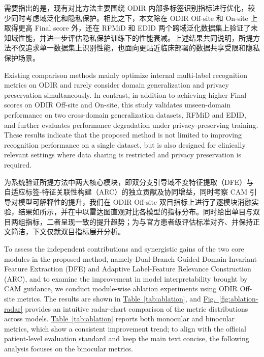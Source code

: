 需要指出的是，现有对比方法主要围绕 ODIR 内部多标签识别指标进行优化，较少同时考虑域泛化和隐私保护。相比之下，本文除在 ODIR Off-site 和 On-site 上取得更高 Final score 外，还在 RFMiD 和 EDID 两个跨域泛化数据集上验证了未知域性能，并进一步评估隐私保护训练下的性能衰减。上述结果共同说明，所提方法不仅追求单一数据集上识别性能，也面向更贴近临床部署的数据共享受限和隐私保护场景。

Existing comparison methods mainly optimize internal multi-label recognition metrics on ODIR and rarely consider domain generalization and privacy preservation simultaneously. In contrast, in addition to achieving higher Final scores on ODIR Off-site and On-site, this study validates unseen-domain performance on two cross-domain generalization datasets, RFMiD and EDID, and further evaluates performance degradation under privacy-preserving training. These results indicate that the proposed method is not limited to improving recognition performance on a single dataset, but is also designed for clinically relevant settings where data sharing is restricted and privacy preservation is required.



为系统验证所提方法中两大核心模块，即双分支引导域不变特征提取（DFE）与自适应标签-特征关联性构建（ARC）的独立贡献及协同增益，同时考察 CAM 引导对模型可解释性的提升，我们在 ODIR Off-site 双目指标上进行了逐模块消融实验，结果如所示，并在中以雷达图直观对比各模型的指标分布。同时给出单目与双目两组指标，二者呈现一致的提升趋势；为与官方患者级评估标准对齐、并保持正文简洁，下文仅就双目指标展开分析。

To assess the independent contributions and synergistic gains of the two core modules in the proposed method, namely Dual-Branch Guided Domain-Invariant Feature Extraction (DFE) and Adaptive Label-Feature Relevance Construction (ARC), and to examine the improvement in model interpretability brought by CAM guidance, we conduct module-wise ablation experiments using ODIR Off-site metrics. The results are shown in \hyperref[tab:ablation]{Table~\ref*{tab:ablation}}, and \hyperref[fig:ablation-radar]{Fig.~\ref*{fig:ablation-radar}} provides an intuitive radar-chart comparison of the metric distributions across models. \hyperref[tab:ablation]{Table~\ref*{tab:ablation}} reports both monocular and binocular metrics, which show a consistent improvement trend; to align with the official patient-level evaluation standard and keep the main text concise, the following analysis focuses on the binocular metrics.

